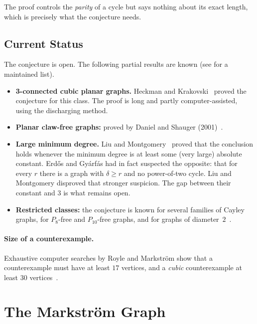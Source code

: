 \documentclass[11pt,a4paper]{article}
\theoremstyle{definition}
\begin{document}
The proof controls the \emph{parity} of a cycle but says nothing about its
exact length, which is precisely what the conjecture needs.

\subsection{Current Status}

The conjecture is open. The following partial results are known (see
\cite{erdosproblems} for a maintained list).

\begin{itemize}[leftmargin=*]
  \item \textbf{3-connected cubic planar graphs.} Heckman and
        Krakovski~\cite{heckman-krakovski} proved the conjecture for this
        class. The proof is long and partly computer-assisted, using the
        discharging method.
  \item \textbf{Planar claw-free graphs:} proved by Daniel and Shauger (2001)~\cite{erdosproblems}.
  \item \textbf{Large minimum degree.} Liu and Montgomery~\cite{liu-montgomery}
        proved that the conclusion holds whenever the minimum degree is at
        least some (very large) absolute constant. Erd\H{o}s and Gy\'arf\'as had
        in fact suspected the opposite: that for every $r$ there is a graph
        with $\delta\ge r$ and no power-of-two cycle. Liu and Montgomery
        disproved that stronger suspicion. The gap between their constant and
        $3$ is what remains open.
  \item \textbf{Restricted classes:} the conjecture is known for several
        families of Cayley graphs, for $P_8$-free and $P_{10}$-free graphs,
        and for graphs of diameter~$2$~\cite{erdosproblems}.
\end{itemize}

\paragraph{Size of a counterexample.}
Exhaustive computer searches by Royle and Markstr\"om show that a
counterexample must have at least $17$ vertices, and a \emph{cubic}
counterexample at least $30$ vertices~\cite{markstrom,erdosproblems}.

\section{The Markstr\"om Graph}\label{sec:markstrom}
\end{document}
